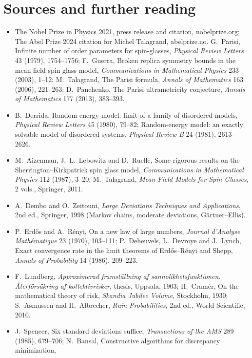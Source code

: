 \section*{Sources and further reading}

\begin{itemize}
\item The Nobel Prize in Physics 2021, press release and citation, nobelprize.org; The Abel Prize 2024 citation for Michel Talagrand, abelprize.no. G.~Parisi, Infinite number of
order parameters for spin-glasses, \emph{Physical Review Letters} 43 (1979), 1754--1756; F.~Guerra, Broken replica symmetry bounds in the mean field spin glass model,
\emph{Communications in Mathematical Physics} 233 (2003), 1--12; M.~Talagrand, The Parisi formula, \emph{Annals of Mathematics} 163 (2006), 221--263; D.~Panchenko, The Parisi
ultrametricity conjecture, \emph{Annals of Mathematics} 177 (2013), 383--393.
\item B.~Derrida, Random-energy model: limit of a family of disordered models, \emph{Physical Review Letters} 45 (1980), 79--82; Random-energy model: an exactly solvable model of
disordered systems, \emph{Physical Review B} 24 (1981), 2613--2626.
\item M.~Aizenman, J.~L.~Lebowitz and D.~Ruelle, Some rigorous results on the Sherrington--Kirkpatrick spin glass model, \emph{Communications in Mathematical Physics} 112 (1987),
3--20; M.~Talagrand, \emph{Mean Field Models for Spin Glasses}, 2 vols., Springer, 2011.
\item A.~Dembo and O.~Zeitouni, \emph{Large Deviations Techniques and Applications}, 2nd ed., Springer, 1998 (Markov chains, moderate deviations, G\"artner--Ellis).
\item P.~Erdős and A.~Rényi, On a new law of large numbers, \emph{Journal d'Analyse Mathématique} 23 (1970), 103--111; P.~Deheuvels, L.~Devroye and J.~Lynch, Exact convergence rate in
the limit theorems of Erdős--Rényi and Shepp, \emph{Annals of Probability} 14 (1986), 209--223.
\item F.~Lundberg, \emph{Approximerad framställning af sannolikhetsfunktionen. Återförsäkring af kollektivrisker}, thesis, Uppsala, 1903; H.~Cramér, On the mathematical theory of
risk, \emph{Skandia Jubilee Volume}, Stockholm, 1930; S.~Asmussen and H.~Albrecher, \emph{Ruin Probabilities}, 2nd ed., World Scientific, 2010.
\item J.~Spencer, Six standard deviations suffice, \emph{Transactions of the AMS} 289 (1985), 679--706; N.~Bansal, Constructive algorithms for discrepancy minimization,

\end{itemize}

